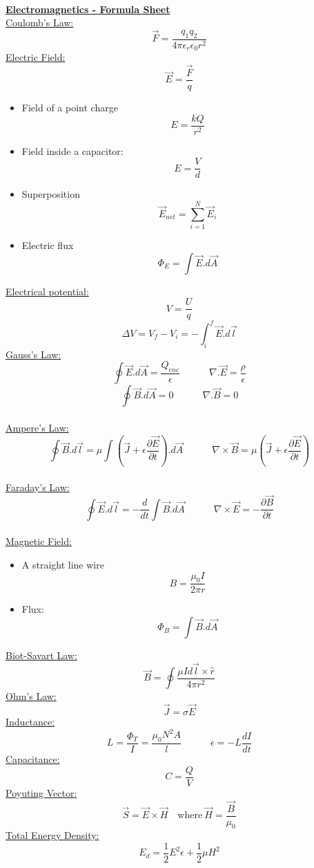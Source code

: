 \documentclass{article}
\begin{document}
\ \\
\underline{\Large{\textbf{Electromagnetics - Formula Sheet}}} \vspace{.5cm}\ \\
\underline{Coulomb's Law:}
\[\vec{F} = \frac{q_{1}q_{2}}{4\pi \epsilon_{r}\epsilon_{0} r^{2}}\]
\underline{Electric Field:}
\[\vec{E} = \frac{\vec{F}}{q}\]
\begin{itemize}
    \item Field of a point charge
    \[E = \frac{kQ}{r^{2}}\]
    \item Field inside a capacitor:
    \[E = \frac{V}{d}\]
    \item Superposition
    \[\vec{E}_{net} = \sum_{i=1}^{N}\vec{E}_{i}\]
    \item Electric flux
    \[\Phi_{E} = \int \vec{E}.d\vec{A}\]
\end{itemize}
\underline{Electrical potential:}
\[V = \frac{U}{q}\] \[\Delta V = V_{f}-V_{i} = -\int_{i}^{f} \vec{E}.d\vec{l}\]
\underline{Gauss's Law:}
\[\oint \vec{E}.d\vec{A} = \frac{Q_{enc}}{\epsilon} \quad \quad \quad \nabla . \vec{E} = \frac{\rho}{\epsilon}\]
\[\oint \vec{B}.d\vec{A} = 0 \quad \quad \quad \nabla . \vec{B} = 0\] \ \\
\underline{Ampere's Law:}
\[\oint \vec{B}.d\vec{l} = \mu \int(\vec{J}+\epsilon \frac{\partial \vec{E}}{\partial t}).d\vec{A} \quad \quad \quad \nabla \times \vec{B} = \mu(\vec{J}+\epsilon \frac{\partial \vec{E}}{\partial t})\]\ \\
\underline{Faraday's Law:}
\[\oint \vec{E}.d\vec{l} = -\frac{d}{dt} \int\vec{B}.d\vec{A} \quad \quad \quad \nabla \times \vec{E} = - \frac{\partial \vec{B}}{\partial t}\] \ \\
\underline{Magnetic Field:}
\begin{itemize}
    \item A straight line wire
    \[B = \frac{\mu_{0} I}{2\pi r}\]
    \item Flux:
    \[\Phi_{B} = \int\vec{B}.d\vec{A}\]
\end{itemize}
\underline{Biot-Savart Law:}
\[ \vec{B} = \oint\frac{\mu I d\vec{l}\times \hat{r}}{4 \pi r^{2}}\]
\underline{Ohm's Law:}
\[\vec{J} = \sigma \vec{E}\]
\underline{Inductance:}
\[L = \frac{\Phi_{T}}{I}=\frac{\mu_{0}N^{2}A}{l} \quad \quad \quad \epsilon = -L\frac{dI}{dt}\]
\underline{Capacitance:}
\[C = \frac{Q}{V}\]
\underline{Poyuting Vector:}
\[\vec{S} = \vec{E}\times \vec{H}\quad \text{where} \ \vec{H}=\frac{\vec{B}}{\mu_{0}}\]
\underline{Total Energy Density:}
\[E_{d}=\frac{1}{2}E^{2}\epsilon+\frac{1}{2}\mu H^{2}\]
\end{document}
